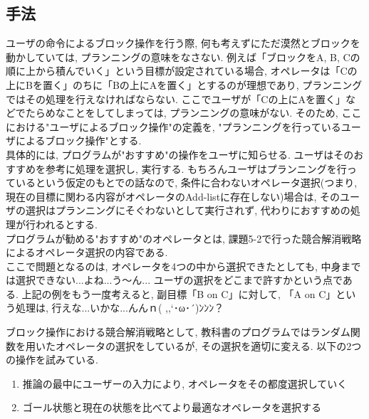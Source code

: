 \documentclass[uplatex,12pt]{jsarticle}
\begin{document}
\subsection{手法}
ユーザの命令によるブロック操作を行う際, 何も考えずにただ漠然とブロックを動かしていては, プランニングの意味をなさない. 例えば「ブロックをA, B, Cの順に上から積んでいく」という目標が設定されている場合, オペレータは「Cの上にBを置く」のちに「Bの上にAを置く」とするのが理想であり, プランニングではその処理を行えなければならない. ここでユーザが「Cの上にAを置く」などでたらめなことをしてしまっては, プランニングの意味がない. そのため, ここにおける"ユーザによるブロック操作"の定義を, "プランニングを行っているユーザによるブロック操作"とする. \\
具体的には, プログラムが"おすすめ"の操作をユーザに知らせる. ユーザはそのおすすめを参考に処理を選択し, 実行する. もちろんユーザはプランニングを行っているという仮定のもとでの話なので, 条件に合わないオペレータ選択(つまり, 現在の目標に関わる内容がオペレータのAdd-listに存在しない)場合は, そのユーザの選択はプランニングにそぐわないとして実行されず, 代わりにおすすめの処理が行われるとする.\\
プログラムが勧める"おすすめ"のオペレータとは, 課題5-2で行った競合解消戦略によるオペレータ選択の内容である.\\


ここで問題となるのは, オペレータを4つの中から選択できたとしても, 中身までは選択できない...よね...う～ん...
ユーザの選択をどこまで許すかという点である. 上記の例をもう一度考えると, 副目標「B on C」に対して, 「A on C」という処理は, 行えな...いかな...んんｎ( ,,`･ω･´)ﾝﾝﾝ？


ブロック操作における競合解消戦略として, 教科書のプログラムではランダム関数を用いたオペレータの選択をしているが, その選択を適切に変える. 以下の2つの操作を試みている.

\begin{enumerate}
\item 推論の最中にユーザーの入力により, オペレータをその都度選択していく
\item ゴール状態と現在の状態を比べてより最適なオペレータを選択する
\end{enumerate} 
\end{document}
